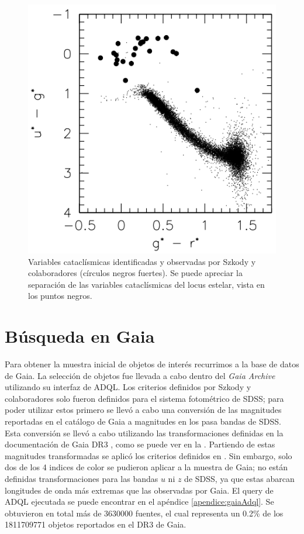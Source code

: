 \begin{figure}[!ht]
	\includegraphics[scale=0.4]{Muestra/Secciones/Figures/ug-gr_Szkody2002.png}

	\caption{Variables cataclísmicas identificadas y observadas por Szkody y
		colaboradores (círculos negros fuertes). Se puede apreciar la separación
		de las variables cataclísmicas del locus estelar, vista en los puntos
		negros. }
	\label{szkody2002ColorColorVCs}
\end{figure}

\section{Búsqueda en Gaia}

Para obtener la muestra inicial de objetos de interés recurrimos a la base de
datos de Gaia. La selección de objetos fue llevada a cabo dentro del
\textit{Gaia Archive} utilizando su interfaz de ADQL. Los criterios
definidos por Szkody y colaboradores solo fueron definidos para el sistema
fotométrico de SDSS; para poder utilizar estos primero se llevó a cabo una
conversión de las magnitudes reportadas en el catálogo de Gaia a magnitudes en
los pasa bandas de SDSS. Esta conversión se llevó a cabo utilizando las
transformaciones definidas en la documentación de Gaia DR3
, como se puede ver en la
. Partiendo de estas magnitudes
transformadas se aplicó los criterios definidos en
. Sin embargo, solo dos de los 4 indices
de color se pudieron aplicar a la muestra de Gaia; no están definidas
transformaciones para las bandas $u$ ni $z$ de SDSS, ya que estas abarcan
longitudes de onda más extremas que las observadas por Gaia. El query de ADQL
ejecutada se puede encontrar en el apéndice \ref{apendice:gaiaAdql}. Se
obtuvieron en total más de \num{3630000} fuentes, el cual representa un 0.2\% de
los \num{1811709771} objetos reportados en el DR3 de Gaia. 

